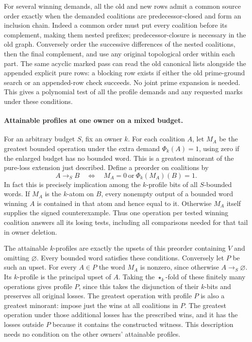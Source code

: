 For several winning demands, all the old and new
rows admit a common source order exactly when the
demanded coalitions are predecessor-closed and form
an inclusion chain. Indeed a common order must put
every coalition before its complement, making them
nested prefixes; predecessor-closure is necessary in
the old graph. Conversely order the successive
differences of the nested coalitions, then the final
complement, and use any original topological order
within each part. The same acyclic marked pass can
read the old canonical lists alongside the appended
explicit pure rows: a blocking row exists if either
the old prime-ground search or an appended-row check
succeeds. No joint prime expansion is needed. This
gives a polynomial test of all the profile demands
and any requested marks under these conditions.

\paragraph{Attainable profiles at one owner on a mixed budget.}
For an arbitrary budget $S$, fix an owner $k$.
For each coalition $A$, let $M_A$ be the greatest
bounded operation under the extra demand
$\Phi_k(A)=1$, using zero if the enlarged budget
has no bounded word. This is a greatest minorant
of the pure-loss extension just described. Define
a preorder on coalitions by
\[
 A\longrightarrow_S B
 \quad\Longleftrightarrow\quad
 M_A=0\ \text{or}\ \Phi_k(M_A)(B)=1.
\]
In fact this is precisely implication among the
$k$-profile bits of all $S$-bounded words. If
$M_A$ is the $k$-atom on $B$, every nonempty output
of a bounded word winning $A$ is contained in
that atom and hence equal to it. Otherwise $M_A$
itself supplies the signed counterexample. Thus one
operation per tested winning coalition answers
all its losing tests, including all comparisons
needed for that tail in owner deletion.

The attainable $k$-profiles are exactly the upsets
of this preorder containing $V$ and omitting
$\varnothing$. Every bounded word satisfies these
conditions. Conversely let $P$ be such an upset.
For every $A\in P$ the word $M_A$ is nonzero,
since otherwise $A\longrightarrow_S\varnothing$.
Its $k$-profile is the principal upset of $A$.
Taking the $\star_k$-fold of these finitely many
operations gives profile $P$, since this takes
the disjunction of their $k$-bits and preserves
all original losses. The greatest operation with
profile $P$ is also a greatest minorant: impose
just the wins at all coalitions in $P$. The
greatest operation under those additional losses
has the prescribed wins, and it has the losses
outside $P$ because it contains the constructed
witness. This description needs no condition on
the other owners' attainable profiles.

